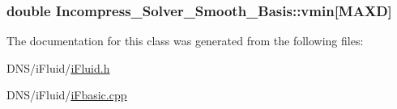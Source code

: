 \subsubsection[{\texorpdfstring{vmin}{vmin}}]{\setlength{\rightskip}{0pt plus 5cm}double Incompress\+\_\+\+Solver\+\_\+\+Smooth\+\_\+\+Basis\+::vmin\mbox{[}{\bf M\+A\+XD}\mbox{]}}\hypertarget{class_incompress___solver___smooth___basis_a0f5db6627058f29c053f3ac6e3fa6a7f}{}\label{class_incompress___solver___smooth___basis_a0f5db6627058f29c053f3ac6e3fa6a7f}


The documentation for this class was generated from the following files\+:\begin{DoxyCompactItemize}
\item 
D\+N\+S/i\+Fluid/\hyperlink{i_fluid_8h}{i\+Fluid.\+h}\item 
D\+N\+S/i\+Fluid/\hyperlink{i_fbasic_8cpp}{i\+Fbasic.\+cpp}\end{DoxyCompactItemize}
